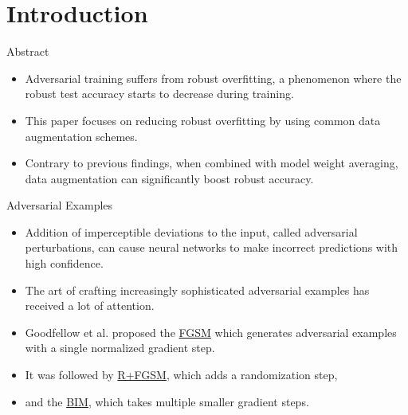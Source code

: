\section{Introduction}

\begin{frame}{Abstract}
    \begin{itemize}
        \item Adversarial training suffers from robust overfitting, a phenomenon where the robust test accuracy starts to decrease during training.
        \item This paper focuses on reducing robust overfitting by using common data augmentation schemes.
        \item Contrary to previous findings, when combined with model weight averaging, data augmentation can significantly boost robust accuracy. 
    \end{itemize}
\end{frame}

\begin{frame}{Adversarial Examples}
    \begin{itemize}
        \item Addition of imperceptible deviations to the input, called adversarial perturbations, can cause neural networks to make incorrect predictions with high confidence.
        \item The art of crafting increasingly sophisticated adversarial examples has received a lot of attention.
        \item Goodfellow et al. proposed the \href{https://arxiv.org/abs/1412.6572}{FGSM} which generates adversarial examples with a single normalized gradient step. 
        \item It was followed by \href{https://arxiv.org/pdf/1705.07204}{R+FGSM}, which adds a randomization step,
        \item and the \href{https://arxiv.org/abs/1607.02533}{BIM}, which takes multiple smaller gradient steps.
    \end{itemize}
\end{frame}


